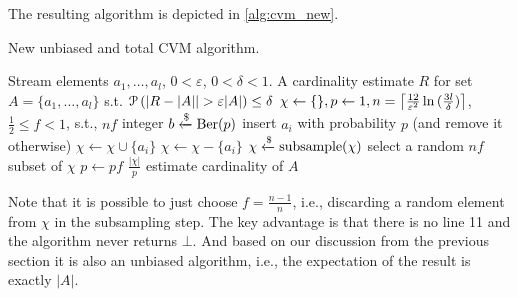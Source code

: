 The resulting algorithm is depicted in \cref{alg:cvm_new}.
\begin{algorithm}[h]
	\caption{New unbiased and total CVM algorithm.}\label{alg:cvm_new}
	\begin{algorithmic}[1]
  \Require Stream elements $a_1,\dots,a_l$, $0 < \varepsilon$, $0 < \delta < 1$.
  \Ensure A cardinality estimate $R$ for set $A = \{ a_1,\dots,a_l \}$ s.t. $\prob \left( |R - |A| | > \varepsilon |A| \right) \leq \delta$
  \State $\chi \gets \{\}, p \gets 1, n = \ceil*{\frac{12}{\varepsilon^2} \ln{(\frac{3l}{\delta})} }$, $\frac{1}{2} \leq f < 1$, s.t., $nf$ integer
    \State $b \getsr \Ber(p)$ \Comment insert $a_i$ with probability $p$ (and remove it otherwise)
      \State $\chi \gets \chi \cup \{a_i\}$
    \Else
      \State $\chi \gets \chi - \{a_i\}$
    \EndIf
      \State $\chi \getsr \mathrm{subsample}(\chi)$ \Comment select a random $nf$ subset of $\chi$
      \State $p \gets pf$
    \EndIf
  \EndFor
  \State \Return $\frac{|\chi|}{p}$ \Comment estimate cardinality of $A$
  \end{algorithmic}
\end{algorithm}%
Note that it is possible to just choose $f = \frac{n-1}{n}$, i.e., discarding a random element from $\chi$ in the subsampling step.
The key advantage is that there is no line 11 and the algorithm never returns $\bot$.
And based on our discussion from the previous section it is also an unbiased algorithm, i.e., the expectation of the result is exactly $|A|$.

